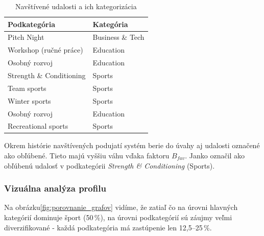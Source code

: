 \begin{table}[H]
\centering
\caption{Navštívené udalosti a ich kategorizácia}
\label{tab:konkretne_eventy}
\small
\begin{tabular}{|l|l|}
\hline
\textbf{Podkategória}    & \textbf{Kategória} \\ \hline
Pitch Night              & Business \& Tech \\
Workshop (ručné práce)   & Education \\
Osobný rozvoj            & Education \\
Strength \& Conditioning & Sports \\
Team sports              & Sports \\
Winter sports            & Sports \\
Osobný rozvoj            & Education \\
Recreational sports      & Sports \\ \hline
\end{tabular}
\end{table}

Okrem histórie navštívených podujatí systém berie do úvahy aj udalosti označené
ako obľúbené. Tieto majú vyššiu váhu vďaka faktoru $B_{fav}$. Janko označil ako
obľúbenú udalosť v podkategórii \textit{Strength \& Conditioning} (Sports).

\subsubsection{Vizuálna analýza profilu}

Na obrázku\ref{fig:porovnanie_grafov} vidíme, že zatiaľ čo na úrovni hlavných
kategórií dominuje šport (50\,\%), na úrovni podkategórií sú záujmy veľmi
diverzifikované - každá podkategória má zastúpenie len 12,5–25\,\%.

